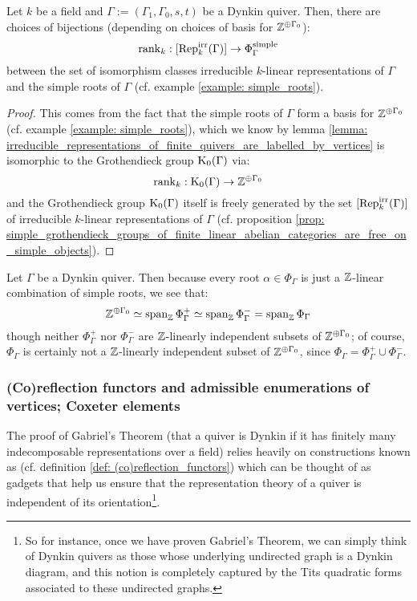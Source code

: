             \begin{proposition} \label{prop: irreducible_representations_of_dynkin_quivers_are_labelled_by_simple_roots}
                Let $k$ be a field and $\Gamma := (\Gamma_1, \Gamma_0, s, t)$ be a Dynkin quiver. Then, there are choices of bijections (depending on choices of basis for $\mathbb{Z}^{\oplus \Gamma_0}$):
                    $$\operatorname{rank}_k: [\mathrm{Rep}_k^{\mathrm{irr}}(\Gamma)] \to \Phi_{\Gamma}^{\mathrm{simple}}$$
                between the set of isomorphism classes irreducible $k$-linear representations of $\Gamma$ and the simple roots of $\Gamma$ (cf. example \ref{example: simple_roots}).
            \end{proposition}
                \begin{proof}
                    This comes from the fact that the simple roots of $\Gamma$ form a basis for $\mathbb{Z}^{\oplus \Gamma_0}$ (cf. example \ref{example: simple_roots}), which we know by lemma \ref{lemma: irreducible_representations_of_finite_quivers_are_labelled_by_vertices} is isomorphic to the Grothendieck group $\mathrm{K}_0(\Gamma)$ via:
                        $$\operatorname{rank}_k: \mathrm{K}_0(\Gamma) \to \mathbb{Z}^{\oplus \Gamma_0}$$
                    and the Grothendieck group $\mathrm{K}_0(\Gamma)$ itself is freely generated by the set $[\mathrm{Rep}_k^{\mathrm{irr}}(\Gamma)]$ of irreducible $k$-linear representations of $\Gamma$ (cf. proposition \ref{prop: simple_grothendieck_groups_of_finite_linear_abelian_categories_are_free_on_simple_objects}).
                \end{proof}
            \begin{remark}
                Let $\Gamma$ be a Dynkin quiver. Then because every root $\alpha \in \Phi_{\Gamma}$ is just a $\mathbb{Z}$-linear combination of simple roots, we see that:
                    $$\mathbb{Z}^{\oplus \Gamma_0} \simeq \operatorname{span}_{\mathbb{Z}} \Phi_{\Gamma}^+ \simeq \operatorname{span}_{\mathbb{Z}} \Phi_{\Gamma}^- = \operatorname{span}_{\mathbb{Z}} \Phi_{\Gamma}$$
                though neither $\Phi_{\Gamma}^+$ nor $\Phi_{\Gamma}^-$ are $\mathbb{Z}$-linearly independent subsets of $\mathbb{Z}^{\oplus \Gamma_0}$; of course, $\Phi_{\Gamma}$ is certainly not a $\mathbb{Z}$-linearly independent subset of $\mathbb{Z}^{\oplus \Gamma_0}$, since $\Phi_{\Gamma} = \Phi_{\Gamma}^+ \cup \Phi_{\Gamma}^-$.
            \end{remark}
            
        \subsubsection{(Co)reflection functors and admissible enumerations of vertices; Coxeter elements}
            The proof of Gabriel's Theorem (that a quiver is Dynkin if it has finitely many indecomposable representations over a field) relies heavily on constructions known as  (cf. definition \ref{def: (co)reflection_functors}) which can be thought of as gadgets that help us ensure that the representation theory of a quiver is independent of its orientation\footnote{So for instance, once we have proven Gabriel's Theorem, we can simply think of Dynkin quivers as those whose underlying undirected graph is a Dynkin diagram, and this notion is completely captured by the Tits quadratic forms associated to these undirected graphs.}. 
            
